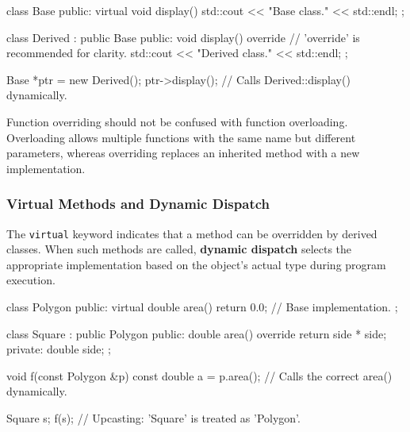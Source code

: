 \vspace{-0.5em}

\begin{codeblock}[language=C++]
class Base {
public:
    virtual void display() {
        std::cout << "Base class." << std::endl;
    }
};

class Derived : public Base {
public:
    void display() override { // 'override' is recommended for clarity.
        std::cout << "Derived class." << std::endl;
    }
};

Base *ptr = new Derived();
ptr->display(); // Calls Derived::display() dynamically.
\end{codeblock}

\vspace{-0.7em}

\begin{tipsblock}
    Function overriding should not be confused with function overloading. Overloading allows multiple functions with the same name but different parameters, whereas overriding replaces an inherited method with a new implementation.
\end{tipsblock}

\vspace{-1em}

\subsubsection{Virtual Methods and Dynamic Dispatch}

\vspace{-0.5em}

The \texttt{virtual} keyword indicates that a method can be overridden by derived classes. When such methods are called, \textbf{dynamic dispatch} selects the appropriate implementation based on the object's actual type during program execution.

\vspace{-0.5em}

\begin{codeblock}[language=C++]
class Polygon {
public:
    virtual double area() { return 0.0; } // Base implementation.
};

class Square : public Polygon {
public:
    double area() override { return side * side; }
private:
    double side;
};

void f(const Polygon &p) {
    const double a = p.area(); // Calls the correct area() dynamically.
}

Square s;
f(s); // Upcasting: 'Square' is treated as 'Polygon'.
\end{codeblock}

